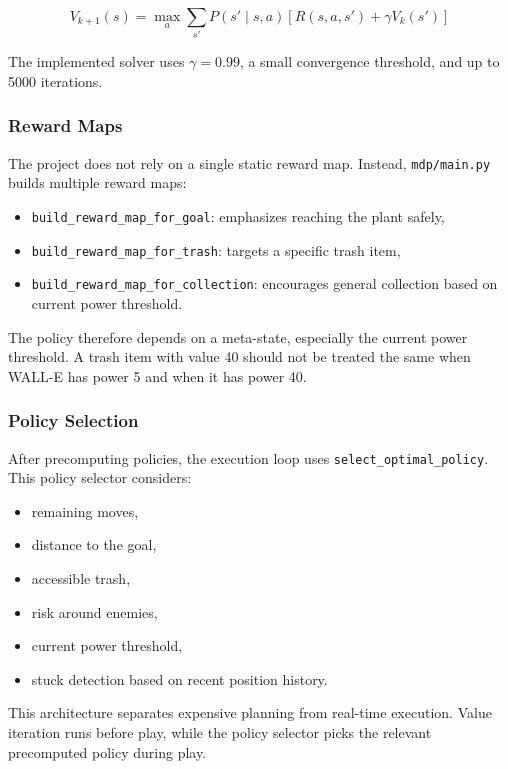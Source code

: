 \documentclass[11pt,a4paper]{article}
\newcommand{\code}[1]{\texttt{#1}}
\begin{document}
\begin{equation}
    V_{k+1}(s) = \max_a \sum_{s'} P(s' \mid s,a)\left[R(s,a,s') + \gamma V_k(s')\right]
\end{equation}

The implemented solver uses \(\gamma = 0.99\), a small convergence threshold, and up to 5000 iterations.

\subsubsection{Reward Maps}

The project does not rely on a single static reward map. Instead, \code{mdp/main.py} builds multiple reward maps:

\begin{itemize}[leftmargin=*]
    \item \code{build\_reward\_map\_for\_goal}: emphasizes reaching the plant safely,
    \item \code{build\_reward\_map\_for\_trash}: targets a specific trash item,
    \item \code{build\_reward\_map\_for\_collection}: encourages general collection based on current power threshold.
\end{itemize}

The policy therefore depends on a meta-state, especially the current power threshold. A trash item with value 40 should not be treated the same when WALL-E has power 5 and when it has power 40.

\subsubsection{Policy Selection}

After precomputing policies, the execution loop uses \code{select\_optimal\_policy}. This policy selector considers:

\begin{itemize}[leftmargin=*]
    \item remaining moves,
    \item distance to the goal,
    \item accessible trash,
    \item risk around enemies,
    \item current power threshold,
    \item stuck detection based on recent position history.
\end{itemize}

This architecture separates expensive planning from real-time execution. Value iteration runs before play, while the policy selector picks the relevant precomputed policy during play.
\end{document}
